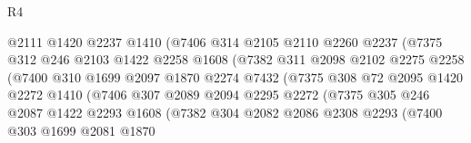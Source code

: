 \begin{lexlean}{R4}
\begin{coremodule}
                            @2111
                            @1420
                            @2237
                            @1410
                            (@7406
                              @314
                              @2105
                              @2110
                              @2260
                              @2237
                              (@7375
                                @312
                                @246
                                @2103
                                @1422
                                @2258
                                @1608
                                (@7382
                                  @311
                                  @2098
                                  @2102
                                  @2275
                                  @2258
                                  (@7400
                                    @310
                                    @1699
                                    @2097
                                    @1870
                                    @2274
                                    @7432
                                    (@7375
                                      @308
                                      @72
                                      @2095
                                      @1420
                                      @2272
                                      @1410
                                      (@7406
                                        @307
                                        @2089
                                        @2094
                                        @2295
                                        @2272
                                        (@7375
                                          @305
                                          @246
                                          @2087
                                          @1422
                                          @2293
                                          @1608
                                          (@7382
                                            @304
                                            @2082
                                            @2086
                                            @2308
                                            @2293
                                            (@7400
                                              @303
                                              @1699
                                              @2081
                                              @1870

\end{coremodule}
\end{lexlean}
